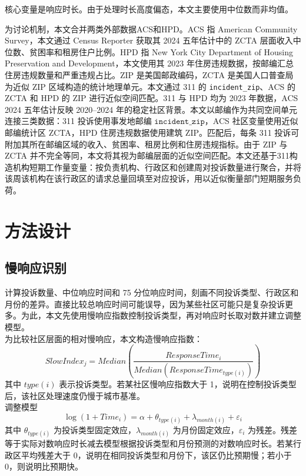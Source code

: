 \documentclass[UTF8,a4paper,12pt]{ctexart}
\begin{document}
核心变量是响应时长。由于处理时长高度偏态，本文主要使用中位数而非均值。

为讨论机制，本文合并两类外部数据ACS和HPD。ACS 指 American Community Survey，本文通过 Census Reporter 获取其 2024 五年估计中的 ZCTA 层面收入中位数、贫困率和租房住户比例。HPD 指 New York City Department of Housing Preservation and Development，本文使用其 2023 年住房违规数据，按邮编汇总住房违规数量和严重违规占比。ZIP 是美国邮政编码，ZCTA 是美国人口普查局为近似 ZIP 区域构造的统计地理单元。本文通过 311 的 \texttt{incident\_zip}、ACS 的 ZCTA 和 HPD 的 ZIP 进行近似空间匹配。311 与 HPD 均为 2023 年数据，ACS 2024 五年估计反映 2020--2024 年的稳定社区背景。本文以邮编作为共同空间单元连接三类数据：311 投诉使用事发地邮编 \(\texttt{incident\_zip}\)，ACS 社区变量使用近似邮编统计区 ZCTA，HPD 住房违规数据使用建筑 ZIP。匹配后，每条 311 投诉可附加其所在邮编区域的收入、贫困率、租房比例和住房违规指标。由于 ZIP 与 ZCTA 并不完全等同，本文将其视为邮编层面的近似空间匹配。本文还基于311构造机构短期工作量变量：按负责机构、行政区和创建周对投诉数量进行聚合，并将该周该机构在该行政区的请求总量回填至对应投诉，用以近似衡量部门短期服务负荷。

\section{方法设计}

\subsection{慢响应识别}

计算投诉数量、中位响应时间和 75 分位响应时间，刻画不同投诉类型、行政区和月份的差异。直接比较总响应时间可能误导，因为某些社区可能只是复杂投诉更多。为此，本文先使用慢响应指数控制投诉类型，再对响应时长取对数并建立调整模型。\\
为比较社区层面的相对慢响应，本文构造慢响应指数：
\begin{equation}
SlowIndex_j = Median\left(\frac{ResponseTime_i}{Median(ResponseTime_{type(i)})}\right)
\end{equation}
其中 \(type(i)\) 表示投诉类型。若某社区慢响应指数大于 1，说明在控制投诉类型后，该社区处理速度仍慢于城市基准。\\
调整模型
\begin{equation}
\log(1+Time_i)=\alpha+\theta_{type(i)}+\lambda_{month(i)}+\varepsilon_i
\end{equation}
其中 \(\theta_{type(i)}\) 为投诉类型固定效应，\(\lambda_{month(i)}\) 为月份固定效应，\(\varepsilon_i\) 为残差。残差等于实际对数响应时长减去模型根据投诉类型和月份预测的对数响应时长。若某行政区平均残差大于 0，说明在相同投诉类型和月份下，该区仍比预期慢；若小于 0，则说明比预期快。
\end{document}
